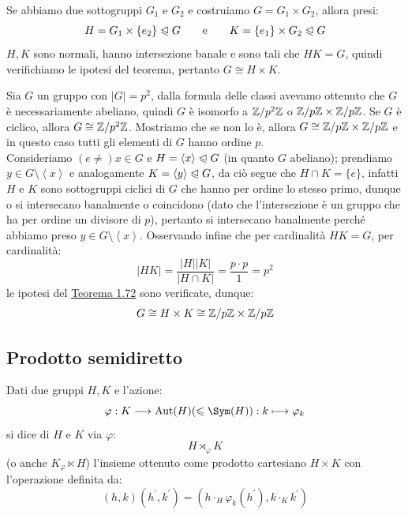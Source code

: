 \documentclass[11pt]{scrartcl}
\begin{document}
\begin{remark}
    Se abbiamo due sottogruppi $G_1$ e $G_2$ e costruiamo $G = G_1 \times G_2$, allora presi:
        \[ H = G_1 \times \{e_2\} \trianglelefteqslant G \qquad \text e \qquad K = \{e_1\} \times G_2 \trianglelefteqslant G
            \]
    $H,K$ sono normali, hanno intersezione banale e sono tali che $HK = G$, quindi verifichiamo le ipotesi del teorema, pertanto $G \cong H \times K$.
\end{remark}

\begin{example}
    Sia $G$ un gruppo con $|G| = p^2$, dalla formula delle classi avevamo ottenuto che $G$ è necessariamente abeliano, quindi $G$ è 
    isomorfo a $\mathbb Z/p^2\mathbb Z$ o ${\mathbb Z}/p{\mathbb Z} \times {\mathbb Z}/p{\mathbb Z}$. Se $G$ è ciclico, allora $G \cong \mathbb Z/p^2\mathbb Z$. Mostriamo che se non lo è, allora $G \cong {\mathbb Z}/p{\mathbb Z} \times {\mathbb Z}/p{\mathbb Z}$ e in 
    questo caso tutti gli elementi di $G$ hanno ordine $p$. \\
    Consideriamo $(e \ne) x \in G$ e $H = \left<x\right> \trianglelefteqslant G$ (in quanto $G$ abeliano); prendiamo $y \in G \setminus\left<x\right>$
    e analogamente $K = \left<y\right> \trianglelefteqslant G$, da ciò segue che $H \cap K = \{e\}$, infatti $H$ e $K$ sono sottogruppi ciclici di $G$
    che hanno per ordine lo stesso primo, dunque o si intersecano banalmente o coincidono (dato che l'intersezione è un gruppo che ha per ordine un divisore di $p$), pertanto si intersecano
    banalmente perché abbiamo preso $y \in G \setminus \left<x\right>$.
    Osservando infine che per cardinalità $HK = G$, per cardinalità:
        \[ |HK| = \frac{|H||K|}{|H \cap K|} = \frac{p\cdot p}{1} = p^2
            \]
    le ipotesi del \hyperref[t:1.72]{Teorema 1.72} sono verificate, dunque:
        \[ G \cong H \times K \cong {\mathbb Z}/p{\mathbb Z} \times {\mathbb Z}/p{\mathbb Z}
            \]
\end{example}

\newpage
\subsection{Prodotto semidiretto}

\begin{definition}
    Dati due gruppi $H,K$ e l'azione:
        \[ \varphi : K \longrightarrow \Aut(H) (\leqslant \Sym(H)) : k \longmapsto \varphi_k
            \]
    si dice  di $H$ e $K$ via $\varphi$:
        \[ H \rtimes_{\varphi} K
            \]
    (o anche $K {_\varphi}\ltimes H$) l'insieme ottenuto come prodotto cartesiano $H \times K$ con l'operazione definita da:
        \[ (h,k) (h^{\prime},k^{\prime}) = (h \cdot_H \varphi_k(h^{\prime}), k \cdot_K k^{\prime})
            \]
\end{definition}
\end{document}
